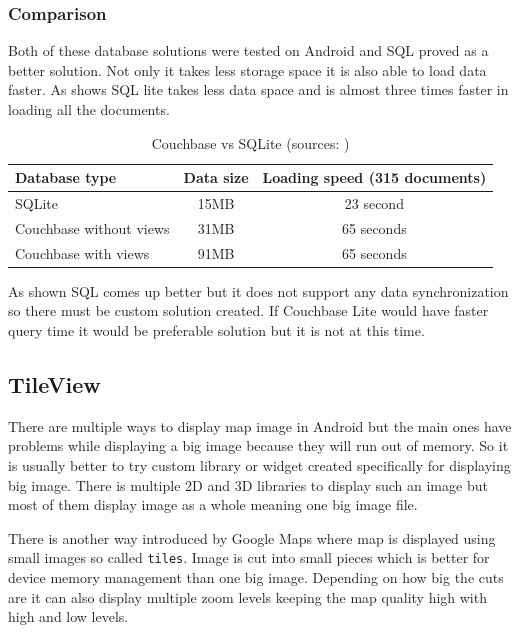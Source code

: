\subsubsection{Comparison}\label{subsec:Comparison}
Both of these database solutions were tested on Android and SQL proved as a better solution. Not only it takes less storage space it is also able to load data faster. As  shows SQL lite takes less data space and is almost three times faster in loading all the documents.

\begin{table}[h]
	\begin{center}
		\begin{tabular}{| l | c | c |}
			\hline
			Database type & Data size & Loading speed (315 documents) \\ \hline
			SQLite & 15MB & 23 second \\ \hline
			Couchbase without views & 31MB & 65 seconds \\ \hline
			Couchbase with views & 91MB & 65 seconds \\ \hline
		\end{tabular}
		\caption{Couchbase vs SQLite (sources: \cite{LGWSP, LGWST, HW2, PM600, AZW3})}
		\label{tab3}
	\end{center}
\end{table}

As shown SQL comes up better but it does not support any data synchronization so there must be custom solution created. If Couchbase Lite would have faster query time it would be preferable solution but it is not at this time.

\subsection{TileView}\label{subsec:TileView}
There are multiple ways to display map image in Android but the main ones have problems while displaying a big image because they will run out of memory. So it is usually better to try custom library or widget created specifically for displaying big image. There is multiple 2D and 3D libraries to display such an image but most of them display image as a whole meaning one big image file. 

There is another way introduced by Google Maps where map is displayed using small images so called \verb|tiles|. Image is cut into small pieces which is better for device memory management than one big image. Depending on how big the cuts are it can also display multiple zoom levels keeping the map quality high with high and low levels.

